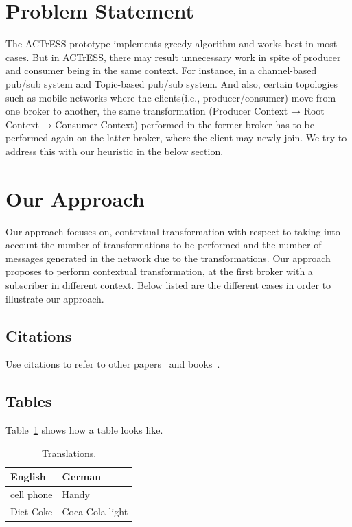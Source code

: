 \documentclass[authoryear,preprint]{sigplanconf}
\begin{document}
\section{Problem Statement}
\label{sec:Problem Statement}

The ACTrESS prototype implements greedy algorithm and works best in most cases. But in
ACTrESS, there may result unnecessary work in spite of producer and consumer being in the same
context. For instance, in a channel-based pub/sub system and Topic-based pub/sub system. And also, certain topologies such as mobile networks where the clients(i.e.,
producer/consumer) move from one broker to another, the same transformation (Producer Context
→ Root Context → Consumer Context) performed in the former broker has to be performed again
on the latter broker, where the client may newly join. We try to address this with our heuristic in the
below section.

\section{Our Approach}
\label{sec:Our Approach}

Our approach focuses on, contextual transformation with respect to taking into account the number of transformations to be performed and the number of messages generated in the network due to the transformations. Our approach proposes to perform contextual transformation, at the first broker with a subscriber in different context. Below listed are the different cases in order to illustrate our approach.


\subsection{Citations}

Use citations to refer to other 
papers~\cite{HerlihyMoss1993-TransactionalMemory,FraserHanson1992-CodeGenerator} 
and books~\cite{Strunk-ElementsOfStyle,Aho86-Compilers}.


\subsection{Tables}

Table~\ref{t:Translations} shows how a table looks like.

\begin{table}[ht]
\centering
\begin{tabular}{ll}
\hline
\textbf{English} & \textbf{German}\\
\hline
cell phone       & Handy\\
Diet Coke        & Coca Cola light\\
\hline
\end{tabular}
\caption[Translations]{\label{t:Translations}Translations.}
\end{table}
\end{document}
